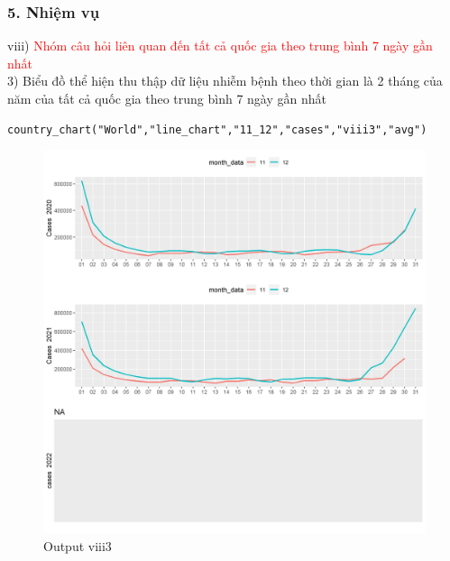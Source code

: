 \documentclass[english,10pt,table]{beamer}
\begin{document}
\begin{frame}[fragile]
\frametitle{5.  Nhiệm vụ}
viii) \textcolor{red}{Nhóm câu hỏi liên quan đến tất cả quốc gia theo trung bình 7 ngày gần nhất}\\
    3) Biểu đồ thể hiện thu thập dữ liệu nhiễm bệnh theo thời gian là 2 tháng của năm của tất cả quốc gia theo trung bình 7 ngày gần nhất
\begin{lstlisting}[frame = single,basicstyle=\tiny]
country_chart("World","line_chart","11_12","cases","viii3","avg")
    \end{lstlisting}
			\begin{figure}[h!]
	\begin{center}
		    \includegraphics[scale = 0.21]{Images/VIII/viii3 World .jpeg}
		     \caption{Output viii3}
		\end{center}
		\end{figure}
\end{frame}
\end{document}
